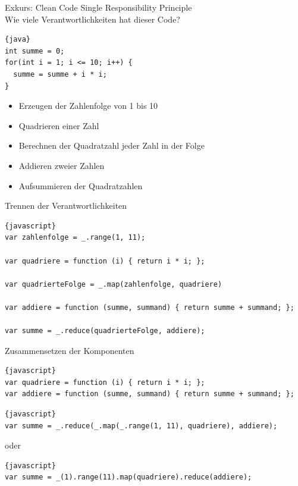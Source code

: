 \begin{frame}[fragile]{Exkurs: Clean Code}
Single Responsibility Principle
\\[2em]

Wie viele Verantwortlichkeiten hat dieser Code?
\begin{lstlisting}{java}
int summe = 0;
for(int i = 1; i <= 10; i++) {
  summe = summe + i * i;
}
\end{lstlisting}

\begin{itemize}
\item Erzeugen der Zahlenfolge von 1 bis 10
\item Quadrieren einer Zahl
\item Berechnen der Quadratzahl jeder Zahl in der Folge
\item Addieren zweier Zahlen
\item Aufsummieren der Quadratzahlen
\end{itemize}

\end{frame}

\begin{frame}[fragile]{Trennen der Verantwortlichkeiten}
\begin{lstlisting}{javascript}
var zahlenfolge = _.range(1, 11);

var quadriere = function (i) { return i * i; };

var quadrierteFolge = _.map(zahlenfolge, quadriere)

var addiere = function (summe, summand) { return summe + summand; };

var summe = _.reduce(quadrierteFolge, addiere);
\end{lstlisting}
\end{frame}

\begin{frame}[fragile]{Zusammensetzen der Komponenten}
\begin{lstlisting}{javascript}
var quadriere = function (i) { return i * i; };
var addiere = function (summe, summand) { return summe + summand; };
\end{lstlisting}

\begin{lstlisting}{javascript}
var summe = _.reduce(_.map(_.range(1, 11), quadriere), addiere);
\end{lstlisting}

oder

\begin{lstlisting}{javascript}
var summe = _(1).range(11).map(quadriere).reduce(addiere);
\end{lstlisting}

\end{frame}



